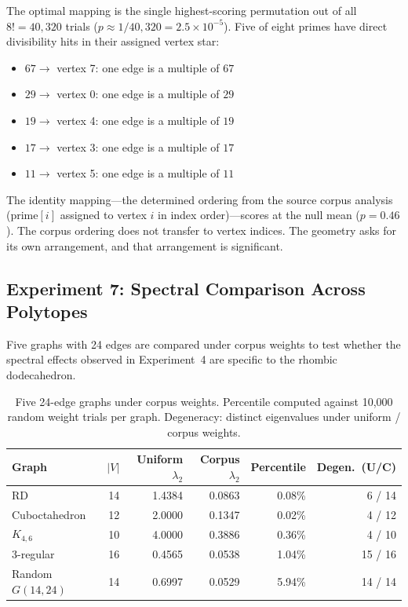 \documentclass[11pt]{article}
\begin{document}
The optimal mapping is the single highest-scoring permutation out of
all $8! = 40{,}320$ trials ($p \approx 1/40{,}320 = 2.5 \times 10^{-5}$).
Five of eight primes have direct divisibility hits in their assigned
vertex star:
\begin{itemize}
  \item $67 \to$ vertex 7: one edge is a multiple of $67$
  \item $29 \to$ vertex 0: one edge is a multiple of $29$
  \item $19 \to$ vertex 4: one edge is a multiple of $19$
  \item $17 \to$ vertex 3: one edge is a multiple of $17$
  \item $11 \to$ vertex 5: one edge is a multiple of $11$
\end{itemize}

The identity mapping---the determined ordering from the source
corpus analysis (prime$[i]$ assigned to vertex $i$ in index
order)---scores at the null mean ($p = 0.46$). The corpus ordering
does not transfer to vertex indices. The geometry asks for its own
arrangement, and that arrangement is significant.

\subsection{Experiment 7: Spectral Comparison Across Polytopes}

Five graphs with 24 edges are compared under corpus weights to test
whether the spectral effects observed in Experiment~4 are specific
to the rhombic dodecahedron.

\begin{table}[H]
\centering
\caption{Five 24-edge graphs under corpus weights. Percentile
  computed against 10{,}000 random weight trials per graph.
  Degeneracy: distinct eigenvalues under uniform / corpus weights.}
\label{tab:exp7}
\begin{tabular}{lrrrrr}
\toprule
Graph & $|V|$ & Uniform $\lambda_2$ & Corpus $\lambda_2$ & Percentile & Degen.\ (U/C) \\
\midrule
RD               & 14 & 1.4384 & 0.0863 & 0.08\% & 6 / 14 \\
Cuboctahedron    & 12 & 2.0000 & 0.1347 & 0.02\% & 4 / 12 \\
$K_{4,6}$        & 10 & 4.0000 & 0.3886 & 0.36\% & 4 / 10 \\
3-regular        & 16 & 0.4565 & 0.0538 & 1.04\% & 15 / 16 \\
Random $G(14,24)$ & 14 & 0.6997 & 0.0529 & 5.94\% & 14 / 14 \\
\bottomrule
\end{tabular}
\end{table}
\end{document}
